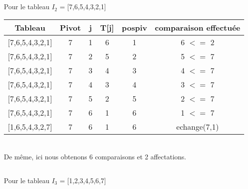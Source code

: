 \documentclass[a4paper]{article}
\begin{document}
\subsection{}
Pour le tableau $I_{2}$ = [7,6,5,4,3,2,1] \\

 \begin{tabular}{ | c | c | c | c | c | c |}
   
   Tableau          & Pivot & j     & T[j]      & pospiv & comparaison effectuée\\
   \hline
   
   [7,6,5,4,3,2,1]  & 7     & 1     & 6         & 1      & 6 $<=$ 2\\
   
   [7,6,5,4,3,2,1]  & 7     & 2     & 5         & 2      & 5 $<=$ 7\\
   
   [7,6,5,4,3,2,1]  & 7     & 3     & 4         & 3      & 4 $<=$ 7 \\
   
   [7,6,5,4,3,2,1]  & 7     & 4     & 3         & 4      & 3 $<=$ 7\\
   
   [7,6,5,4,3,2,1]  & 7     & 5     & 2         & 5      & 2 $<=$ 7\\
   
   [7,6,5,4,3,2,1]  & 7     & 6     & 1         & 6      & 1 $<=$ 7\\
   
   [1,6,5,4,3,2,7]  & 7     & 6     & 1         & 6      & echange(7,1)\\
   
 \end{tabular}
\vspace*{5 mm}\\
De même, ici nous obtenons 6 comparaisons et 2 affectations.

\subsection{}
Pour le tableau $I_{3}$ = [1,2,3,4,5,6,7] \\
\end{document}
